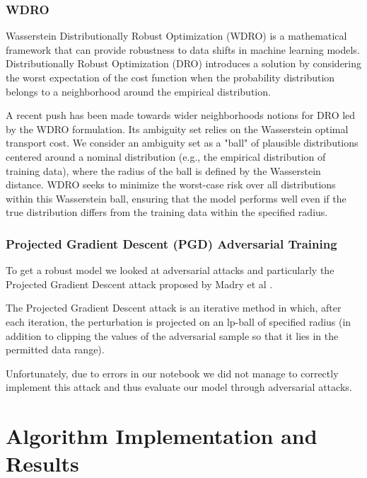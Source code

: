 \documentclass[12pt, a4paper]{article}
\begin{document}
\subsubsection{WDRO}

Wasserstein Distributionally Robust Optimization (WDRO) is a mathematical framework that can provide robustness to data shifts in machine learning models. Distributionally Robust Optimization (DRO) introduces a solution by considering the worst expectation of the cost function when the probability distribution belongs to a neighborhood around the empirical distribution. 

A recent push has been made towards wider neighborhoods notions for DRO led by the WDRO formulation. Its ambiguity set relies on the Wasserstein optimal transport cost. We consider an ambiguity set as a "ball" of plausible distributions centered around a nominal distribution (e.g., the empirical distribution of training data), where the radius of the ball is defined by the Wasserstein distance. WDRO seeks to minimize the worst-case risk over all distributions within this Wasserstein ball, ensuring that the model performs well even if the true distribution differs from the training data within the specified radius. \cite{mohajerin2018data,gao2024wasserstein, kuhn2019wasserstein}

\subsubsection{Projected Gradient Descent (PGD) Adversarial Training}

To get a robust model we looked at adversarial attacks and particularly the Projected Gradient Descent attack proposed by Madry et al \cite{madry2017towards}.

The Projected Gradient Descent attack is an iterative method in which, after each iteration, the perturbation is projected on an lp-ball of specified radius (in addition to clipping the values of the adversarial sample so that it lies in the permitted data range).

Unfortunately, due to errors in our notebook we did not manage to correctly implement this attack and thus evaluate our model through adversarial attacks.


\section{Algorithm Implementation and Results}
\end{document}
